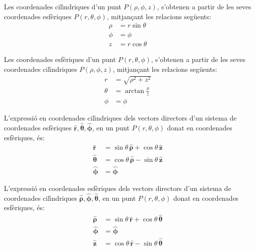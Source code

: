 \documentclass[catalan,a4paper,twoside,11pt]{article}
\begin{document}
Les coordenades cil\'{\i}ndriques  d'un punt $P(\rho,\phi,z)$,
s'obtenen a partir de les seves coordenades esf\`{e}riques
$P(r,\theta,\phi)$, mitjan\c{c}ant les relacions seg\"{u}ents:
\begin{subequations}\begin{align}
    \rho &=r\sin\theta \\ \phi &=\phi \\z &=r\cos\theta
\end{align}\end{subequations}

Les coordenades  esf\`{e}riques  d'un punt $P(r,\theta,\phi)$,
s'obtenen a partir de les seves coordenades cil\'{\i}ndriques
$P(\rho,\phi,z)$, mitjan\c{c}ant les relacions seg\"{u}ents:
\begin{subequations}\begin{align}
    r &=\sqrt{\rho^2+z^2}\\
    \theta &=\arctan\frac{\rho}{z}\\
    \phi &=\phi
\end{align}\end{subequations}

L'expressi\'{o} en coordenades cil\'{\i}ndriques dels vectors directors d'un sistema de coordenades  esf\`{e}riques $\boldsymbol{\hat{r}},\boldsymbol{\hat{\theta}},\boldsymbol{\hat{\phi}}$, en un punt $P(r,\theta,\phi)$ donat en coordenades esf\`{e}riques, \'{e}s:
\begin{subequations}\begin{align}
    \boldsymbol{\hat{r}} &=\sin\theta\,\boldsymbol{\hat{\rho}}+\cos\theta\,\boldsymbol{\hat{z}}\\
    \boldsymbol{\hat{\theta}}
    &=\cos\theta\,\boldsymbol{\hat{\rho}}-\sin\theta\,\boldsymbol{\hat{z}}\\
    \boldsymbol{\hat{\phi}}&=\boldsymbol{\hat{\phi}}
\end{align}\end{subequations}

L'expressi\'{o} en coordenades esf\`{e}riques dels vectors directors d'un sistema de coordenades  cil\'{\i}ndriques $\boldsymbol{\hat{\rho}},\boldsymbol{\hat{\phi}},\boldsymbol{\hat{\theta}}$, en un punt $P(r,\theta,\phi)$ donat en coordenades esf\`{e}riques, \'{e}s:
\begin{subequations}\begin{align}
    \boldsymbol{\hat{\rho}} &=\sin\theta\,\boldsymbol{\hat{r}}+
    \cos\theta\,\boldsymbol{\hat{\theta}}\\
    \boldsymbol{\hat{\phi}}&=\boldsymbol{\hat{\phi}}\\
    \boldsymbol{\hat{z}} &=\cos\theta\,\boldsymbol{\hat{r}}-
    \sin\theta\,\boldsymbol{\hat{\theta}}
\end{align}\end{subequations}
\end{document}
